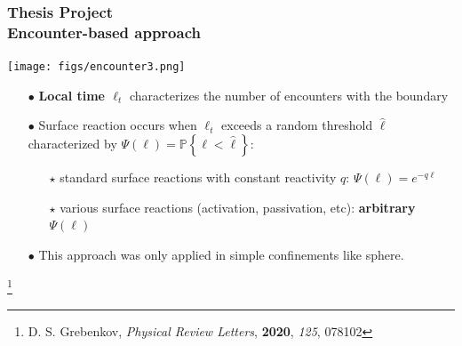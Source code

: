 \documentclass[9pt]{beamer}
\newcommand\blfootnote[1]{%
  \begingroup
  \renewcommand\thefootnote{}\footnote{#1}%
  \addtocounter{footnote}{-1}%
  \endgroup
}
\newcommand{\llc}{\left\{}
\newcommand{\rrc}{\right\}}
\newcommand{\tit}{\textit}
\newcommand{\tbf}{\textbf}
\begin{document}
\begin{frame}[fragile]
  \frametitle{\tbf{Thesis Project}\\
\small{Encounter-based approach} }


\large

\begin{center}
\texttt{[image: figs/encounter3.png]}
\end{center}


	\begin{itemize}
	    	\setlength{\itemsep}{6pt}
		\item[$\bullet$] \tbf{Local time $\ell_t$ }characterizes the number of encounters with the boundary
		\item[$\bullet$] Surface reaction occurs when $\ell_t$ exceeds a random threshold $\hat\ell$ \\ characterized by $\Psi(\ell) = \mathbb{P} \llc \ell < \hat{\ell} \rrc$:
		\begin{itemize}
\large
          \item[$\star$] standard surface reactions with constant reactivity $q$: $\Psi(\ell) = e^{-q\ell}$
          \item[$\star$] various surface reactions (activation, passivation, etc): \tbf{arbitrary} $\Psi(\ell)$
        \end{itemize}
		\item[$\bullet$] This approach was only applied in simple confinements like sphere.
	\end{itemize}


  
  \blfootnote{D. S. Grebenkov, \tit{Physical Review Letters}, \tbf{2020}, \tit{125}, 078102}
  
  
\end{frame}
\end{document}
